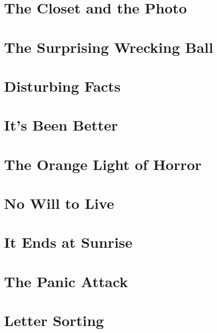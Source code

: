 \documentclass[smalldemyvopaper,11pt,twoside,onecolumn,openright,extrafontsizes]{memoir}
\begin{document}
\chapter{The Closet and the Photo}

\chapter{The Surprising Wrecking Ball}

\chapter{Disturbing Facts}

\chapter{It's Been Better}

\chapter{The Orange Light of Horror}

\chapter{No Will to Live}

\chapter{It Ends at Sunrise}

\chapter{The Panic Attack}

\chapter{Letter Sorting}


\end{document}
